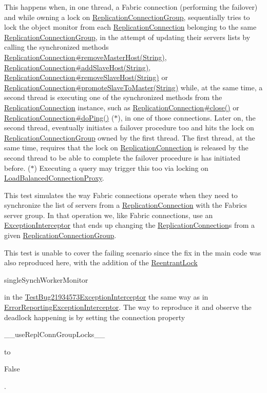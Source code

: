 This happens when, in one thread, a Fabric connection (performing the failover) and while owning a lock on \mbox{\hyperlink{}{Replication\+Connection\+Group}}, sequentially tries to lock the object monitor from each \mbox{\hyperlink{}{Replication\+Connection}} belonging to the same \mbox{\hyperlink{}{Replication\+Connection\+Group}}, in the attempt of updating their servers lists by calling the synchronized methods \mbox{\hyperlink{interfacecom_1_1mysql_1_1cj_1_1jdbc_1_1ha_1_1_replication_connection_a7e1cf8606d5b42c57ce5dfae63d981e3}{Replication\+Connection\#remove\+Master\+Host(\+String)}}, \mbox{\hyperlink{interfacecom_1_1mysql_1_1cj_1_1jdbc_1_1ha_1_1_replication_connection_ace5387750423fcebedca50789d44a26c}{Replication\+Connection\#add\+Slave\+Host(\+String)}}, \mbox{\hyperlink{}{Replication\+Connection\#remove\+Slave\+Host(\+String)}} or \mbox{\hyperlink{interfacecom_1_1mysql_1_1cj_1_1jdbc_1_1ha_1_1_replication_connection_abeccff634ae5dc9f96295b012c458500}{Replication\+Connection\#promote\+Slave\+To\+Master(\+String)}} while, at the same time, a second thread is executing one of the synchronized methods from the \mbox{\hyperlink{}{Replication\+Connection}} instance, such as \mbox{\hyperlink{}{Replication\+Connection\#close()}} or \mbox{\hyperlink{}{Replication\+Connection\#do\+Ping()}} ($\ast$), in one of those connections. Later on, the second thread, eventually initiates a failover procedure too and hits the lock on \mbox{\hyperlink{}{Replication\+Connection\+Group}} owned by the first thread. The first thread, at the same time, requires that the lock on \mbox{\hyperlink{}{Replication\+Connection}} is released by the second thread to be able to complete the failover procedure is has initiated before. ($\ast$) Executing a query may trigger this too via locking on \mbox{\hyperlink{}{Load\+Balanced\+Connection\+Proxy}}.

This test simulates the way Fabric connections operate when they need to synchronize the list of servers from a \mbox{\hyperlink{}{Replication\+Connection}} with the Fabric\textquotesingle{}s server group. In that operation we, like Fabric connections, use an \mbox{\hyperlink{}{Exception\+Interceptor}} that ends up changing the \mbox{\hyperlink{}{Replication\+Connection}}s from a given \mbox{\hyperlink{}{Replication\+Connection\+Group}}.

This test is unable to cover the failing scenario since the fix in the main code was also reproduced here, with the addition of the \mbox{\hyperlink{}{Reentrant\+Lock}} 
\begin{DoxyCode}
singleSynchWorkerMonitor 
\end{DoxyCode}
 in the \mbox{\hyperlink{}{Test\+Bug21934573\+Exception\+Interceptor}} the same way as in \mbox{\hyperlink{}{Error\+Reporting\+Exception\+Interceptor}}. The way to reproduce it and observe the deadlock happening is by setting the connection property
\begin{DoxyCode}
\_\_useReplConnGroupLocks\_\_ 
\end{DoxyCode}
 to
\begin{DoxyCode}
False 
\end{DoxyCode}
 .

